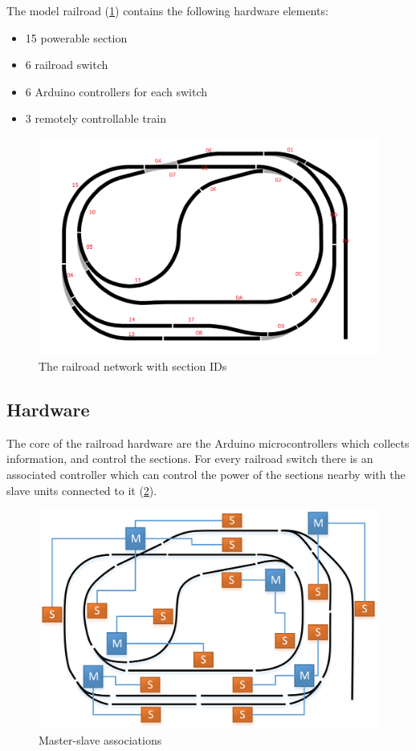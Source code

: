 \noindent The model railroad (\cref{fig:case_study:total_map}) contains the following hardware elements:
\begin{itemize}
	\item 15 powerable section
	\item 6 railroad switch
	\item 6 Arduino controllers for each switch
	\item 3 remotely controllable train
\end{itemize}

\begin{figure}[h]
	\centering
	\includegraphics[width=0.8\linewidth]{include/figures/chapter_6/total_view_1}
	\caption{The railroad network with section IDs}
	\label{fig:case_study:total_map}
\end{figure}

\subsection{Hardware}
The core of the railroad hardware are the Arduino microcontrollers which collects information, and control the sections. For every railroad switch there is an associated controller which can control the power of the sections nearby with the slave units connected to it (\cref{fig:case_study:master_slave}).

\begin{figure}[h]
	\centering
	\includegraphics[width=0.8\linewidth]{include/figures/chapter_6/railroad_ms}
	\caption{Master-slave associations}
	\label{fig:case_study:master_slave}
\end{figure}

